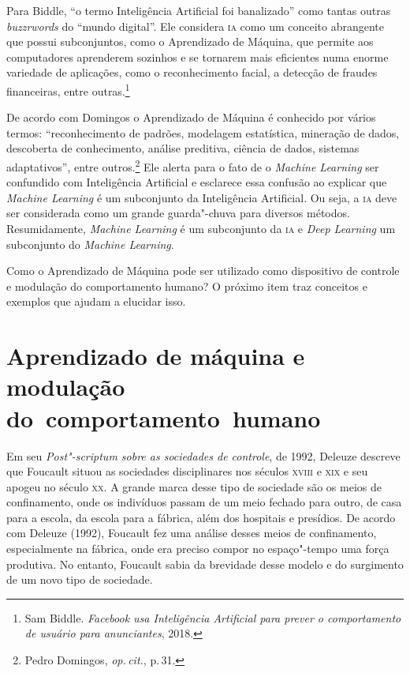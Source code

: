 Para Biddle, ``o termo Inteligência Artificial foi banalizado''
como tantas outras \textit{buzzrwords} do ``mundo digital''. Ele considera
\textsc{ia} como um conceito abrangente que possui subconjuntos, como o
Aprendizado de Máquina, que permite aos computadores aprenderem sozinhos
e se tornarem mais eficientes numa enorme variedade de aplicações, como
o reconhecimento facial, a detecção de fraudes financeiras, entre outras.\footnote{Sam Biddle. \textit{Facebook usa Inteligência Artificial para prever o
comportamento de usuário para anunciantes}, 2018.}

De acordo com Domingos o Aprendizado de Máquina é conhecido por
vários termos: ``reconhecimento de padrões, modelagem estatística,
mineração de dados, descoberta de conhecimento, análise preditiva,
ciência de dados, sistemas adaptativos'', entre outros.\footnote{Pedro Domingos, \textit{op.\,cit.}, p.\,31.} Ele
alerta para o fato de o \textit{Machine Learning} ser confundido com
Inteligência Artificial e esclarece essa confusão ao explicar que
\textit{Machine Learning} é um subconjunto da Inteligência Artificial. Ou
seja, a \textsc{ia} deve ser considerada como um grande guarda"-chuva para
diversos métodos. Resumidamente, \textit{Machine Learning} é um subconjunto
da \textsc{ia} e \textit{Deep Learning} um subconjunto do \textit{Machine Learning}.

Como o Aprendizado de Máquina pode ser utilizado como dispositivo de
controle e modulação do comportamento humano? O próximo item traz
conceitos e exemplos que ajudam a elucidar isso.

\section{Aprendizado de máquina e modulação do~comportamento~humano}

Em seu \textit{Post"-scriptum sobre as sociedades de controle}, de 1992, Deleuze
descreve que Foucault situou as sociedades disciplinares nos
séculos \textsc{xviii} e \textsc{xix} e seu apogeu no século \textsc{xx}. A grande marca desse tipo
de sociedade são os meios de confinamento, onde os indivíduos passam de
um meio fechado para outro, de casa para a escola, da escola para a
fábrica, além dos hospitais e presídios. De acordo com Deleuze (1992),
Foucault fez uma análise desses meios de confinamento, especialmente na
fábrica, onde era preciso compor no espaço"-tempo uma força produtiva. No
entanto, Foucault sabia da brevidade desse modelo e do surgimento de um
novo tipo de sociedade.

